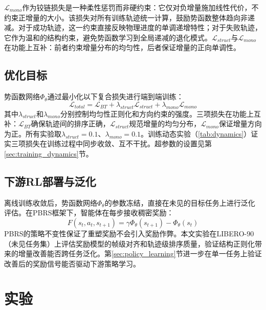 $\mathcal{L}_{mono}$作为铰链损失是一种柔性惩罚而非硬约束：它仅对负增量施加线性代价，不约束正增量的大小。该损失对所有训练轨迹统一计算，鼓励势函数整体趋向非递减。对于成功轨迹，这一约束直接反映物理进度的单调递增特性；对于失败轨迹，它作为温和的结构约束，避免势函数学习到全局递减的退化模式。$\mathcal{L}_{struct}$与$\mathcal{L}_{mono}$在功能上互补：前者约束增量分布的均匀性，后者保证增量的正向单调性。

\subsection{优化目标}
\label{sec:joint_objective}

势函数网络$\Phi_\theta$通过最小化以下复合损失进行端到端训练：
\begin{equation}
\label{eq:total_loss}
    \mathcal{L}_{total} = \mathcal{L}_{BT} + \lambda_{struct} \mathcal{L}_{struct} + \lambda_{mono} \mathcal{L}_{mono}
\end{equation}
其中$\lambda_{struct}$和$\lambda_{mono}$分别控制均匀性正则化和方向约束的强度。三项损失在功能上互补：$\mathcal{L}_{BT}$确保轨迹间的排序正确，$\mathcal{L}_{struct}$规范增量的均匀分布，$\mathcal{L}_{mono}$保证增量方向为正。所有实验取$\lambda_{struct} = 0.1$、$\lambda_{mono} = 0.1$。训练动态实验（\cref{tab:dynamics}）证实三项损失在训练过程中同步收敛、互不干扰。超参数的设置见第\ref{sec:training_dynamics}节。

\subsection{下游RL部署与泛化}

离线训练收敛后，势函数网络$\Phi_\theta$的参数冻结，直接在未见的目标任务上进行泛化评估。在PBRS框架下，智能体在每步接收稠密奖励：
\begin{equation}
\label{eq:deploy}
    F(s_t, a_t, s_{t+1}) = \gamma \Phi_\theta(s_{t+1}) - \Phi_\theta(s_t)
\end{equation}
PBRS的策略不变性保证了重塑奖励不会引入奖励作弊。本文实验在LIBERO-90（未见任务集）上评估奖励模型的帧级对齐和轨迹级排序质量，验证结构正则化带来的增量改善能否跨任务泛化。第\ref{sec:policy_learning}节进一步在单一任务上验证改善后的奖励信号能否驱动下游策略学习。



\clearpage

\section{实验}

